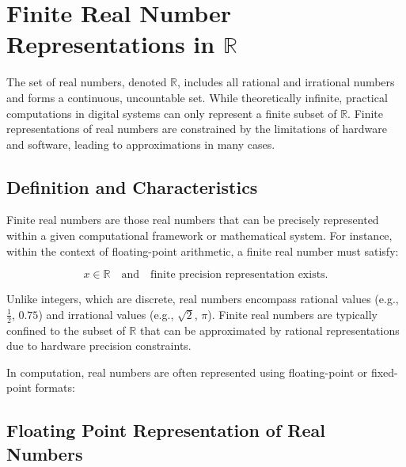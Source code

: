 \chapter{Finite Real Number Representations in $\mathbb{R}$}\label{floarReprezentation}\label{chap:floating_point}
\localtoc

The set of real numbers, denoted \( \mathbb{R} \), includes all rational and irrational numbers and forms a continuous, uncountable set. While theoretically infinite, practical computations in digital systems can only represent a finite subset of \( \mathbb{R} \). Finite representations of real numbers are constrained by the limitations of hardware and software, leading to approximations in many cases. 

\section{Definition and Characteristics}

Finite real numbers are those real numbers that can be precisely represented within a given computational framework or mathematical system. For instance, within the context of floating-point arithmetic, a finite real number must satisfy:

\[
x \in \mathbb{R} \quad \text{and} \quad \text{finite precision representation exists}.
\]

Unlike integers, which are discrete, real numbers encompass rational values (e.g., \( \frac{1}{2} \), \( 0.75 \)) and irrational values (e.g., \( \sqrt{2} \), \( \pi \)). Finite real numbers are typically confined to the subset of \( \mathbb{R} \) that can be approximated by rational representations due to hardware precision constraints.

In computation, real numbers are often represented using floating-point or fixed-point formats:

\section{Floating Point Representation of Real Numbers}

